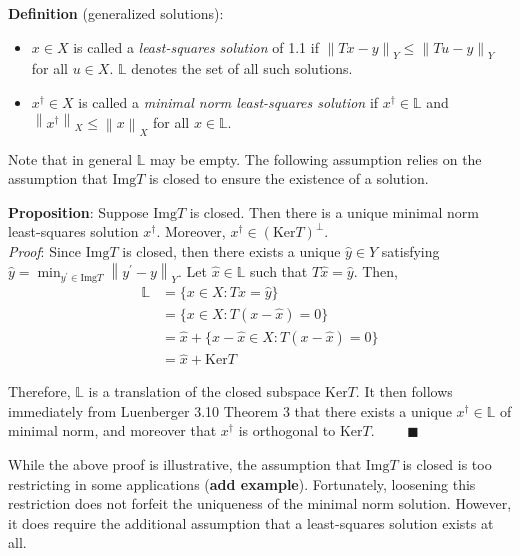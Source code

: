 \documentclass[12pt]{article}
\newcommand*{\norm}[1]{\left\lVert#1\right\rVert}
\newcommand{\Img}{\mathrm{Img}}
\newcommand{\Ker}{\mathrm{Ker}}
\begin{document}
 \textbf{Definition} (generalized solutions): 
 \begin{itemize}
 \item $x \in X$ is called a \textit{least-squares solution} of 1.1 if $\norm{Tx - y}_Y \leq \norm{Tu - y}_Y$ for all $u \in X$. $\mathbb{L}$ denotes the set of all such solutions. 
 \item $x^\dagger \in X$ is called a \textit{minimal norm least-squares solution} if $x^\dagger \in \mathbb{L}$ and $\norm{x^\dagger}_X \leq \norm{x}_X$ for all $x \in \mathbb{L}$. 
 \end{itemize} 
 
 Note that in general $\mathbb{L}$ may be empty. The following assumption relies on the assumption that $\Img T$ is closed to ensure the existence of a solution. 
 
 \textbf{Proposition}: Suppose $\Img T$ is closed. Then there is a unique minimal norm least-squares solution $x^\dagger$. Moreover, $x^\dagger \in (\Ker T)^\perp$. \\[.1cm]
 
 \textit{Proof}: Since $\Img T$ is closed, then there exists a unique $\hat{y} \in Y$ satisfying $\hat{y} = \min_{y^\prime \in \Img T} \norm{y^\prime - y}_{Y}$. Let $\hat{x} \in \mathbb{L}$ such that $T\hat{x} = \hat{y}$. Then, 
 \begin{align*} 
 \mathbb{L} &= \{x \in X: Tx = \hat{y}\} \\
                   &= \{x \in X: T(x - \hat{x}) = 0\} \\
                   &= \hat{x} + \{x - \hat{x} \in X: T(x - \hat{x}) = 0\} \\
                   &= \hat{x} + \Ker T
 \end{align*}  
 
 Therefore, $ \mathbb{L}$ is a translation of the closed subspace $\Ker T$. It then follows immediately from Luenberger 3.10 Theorem 3 that there exists a unique $x^\dagger \in \mathbb{L}$ of minimal norm, and moreover that $x^\dagger$ is orthogonal to $\Ker T$. $\qquad \blacksquare$
 
 While the above proof is illustrative, the assumption that $\Img T$ is closed is too restricting in some applications (\textbf{add example}). Fortunately, loosening this restriction does not forfeit the uniqueness of the minimal norm solution. However, it does require the additional assumption that a least-squares solution exists at all. 
 
\end{document}
